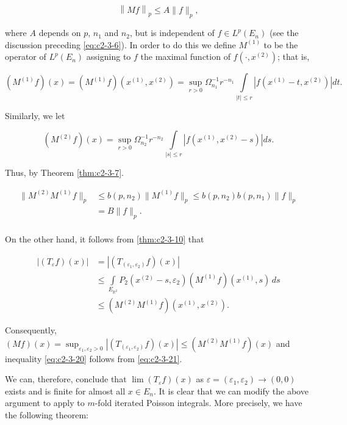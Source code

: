 \begin{equation}\label{eq:c2-3-20}
\left\|M f\right\|_{p}\leq A\|f\|_{p},
\end{equation}

where $A$ depends on $p$, $n_1$ and $n_2$, but is independent of $f \in L^p(E_n)$ (see the discussion preceding \eqref{eq:c2-3-6}). In order to do this we define $M^{(1)}$ to be the operator of $L^p(E_n)$ assigning to $f$ the maximal function of $f(\cdot, x^{(2)})$; that is,

\[
(M^{(1)}f)(x)=(M^{(1)}f)(x^{(1)},x^{(2)})=\sup_{r>0}\Omega_{n_{1}}^{-1}r^{-n_{1}}\int\limits_{|t|\leq r}\left|f(x^{(1)}-t,x^{(2)})\right|d t.
\]

Similarly, we let

\[
(M^{(2)}f)(x)=\sup_{r>0}\Omega_{n_{2}}^{-1}r^{-n_{2}}\int\limits_{|s|\leq r}\left|f(x^{(1)},x^{(2)}-s)\right|d s.
\]

Thus, by Theorem \ref{thm:c2-3-7}.

\begin{equation}\label{eq:c2-3-21}
\begin{aligned}{\|M^{(2)}M^{(1)}f\|_{p}}&{{}\leq b(p,n_{2})\|M^{(1)}f\|_{p}\leq b(p,n_{2})b(p,n_{1})\|f\|_{p}}\\ {}&{{}=B\|f\|_{p}.}\\ \end{aligned}
\end{equation}

On the other hand, it follows from \eqref{thm:c2-3-10} that

\[
\begin{aligned}|(T_{\varepsilon}f)(x)|&=\left|(T_{(\varepsilon_{1},\varepsilon_{2})}f)(x)\right|\\&\leq\int\limits_{E_{\mathbb{R}^{2}}}P_{2}(x^{(2)}-s,\varepsilon_{2})(M^{(1)}f)(x^{(1)},s)\,ds\\&\leq(M^{(2)}M^{(1)}f)(x^{(1)},x^{(2)}).\end{aligned}
\]

Consequently, $(Mf)(x) = \sup_{\varepsilon_1, \varepsilon_2 > 0} |(T_{(\varepsilon_1, \varepsilon_2)} f)(x)| \leq (M^{(2)} M^{(1)} f)(x)$ and inequality \eqref{eq:c2-3-20} follows from \eqref{eq:c2-3-21}.

We can, therefore, conclude that $\lim (T_\varepsilon f)(x)$ as $\varepsilon = (\varepsilon_1, \varepsilon_2) \to (0, 0)$ exists and is finite for almost all $x \in E_n$. It is clear that we can modify the above argument to apply to $m$-fold iterated Poisson integrals. More precisely, we have the following theorem:

